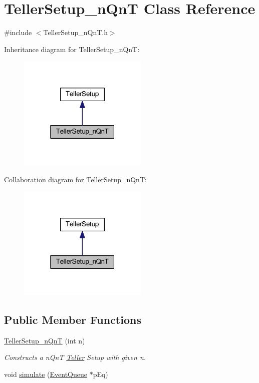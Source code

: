 \hypertarget{class_teller_setup__n_qn_t}{}\section{Teller\+Setup\+\_\+n\+QnT Class Reference}
\label{class_teller_setup__n_qn_t}


{\ttfamily \#include $<$Teller\+Setup\+\_\+n\+Qn\+T.\+h$>$}



Inheritance diagram for Teller\+Setup\+\_\+n\+QnT\+:
\nopagebreak
\begin{figure}[H]
\begin{center}
\leavevmode
\includegraphics[width=175pt]{class_teller_setup__n_qn_t__inherit__graph}
\end{center}
\end{figure}


Collaboration diagram for Teller\+Setup\+\_\+n\+QnT\+:
\nopagebreak
\begin{figure}[H]
\begin{center}
\leavevmode
\includegraphics[width=175pt]{class_teller_setup__n_qn_t__coll__graph}
\end{center}
\end{figure}
\subsection*{Public Member Functions}
\begin{DoxyCompactItemize}
\item 
\hyperlink{class_teller_setup__n_qn_t_aa76a1c946ba54abc4930f6aeee69f229}{Teller\+Setup\+\_\+n\+QnT} (int n)
\begin{DoxyCompactList}\small\item\em Constructs a n\+QnT \hyperlink{class_teller}{Teller} Setup with given n. \end{DoxyCompactList}\item 
void \hyperlink{class_teller_setup__n_qn_t_a2fcbc047bcbdc25f1d123fe65ee80625}{simulate} (\hyperlink{class_event_queue}{Event\+Queue} $\ast$p\+Eq)
\end{DoxyCompactItemize}
